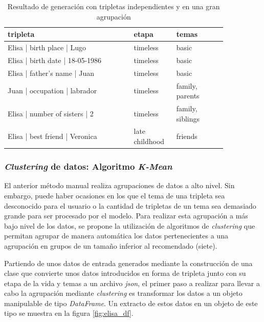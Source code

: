 \begin{table}[h!]
\begin{center}
\begin{tabular}{p{0.5\linewidth} | p{0.15\linewidth} | p{0.2\linewidth}}
\hline

\textbf{tripleta} & \textbf{etapa} & \textbf{temas}  \\ \hline
Elisa | birth place | Lugo & timeless & basic \\ \hline
Elisa | birth date | 18-05-1986 & timeless & basic \\ \hline
Elisa | father's name | Juan & timeless & basic  \\ \hline
Juan | occupation | labrador & timeless & family, parents  \\ \hline
Elisa | number of sisters | 2 & timeless & family, siblings  \\ \hline
Elisa | best friend | Veronica & late childhood & friends  \\ \hline
    
\hline
\end{tabular}
\caption{Resultado de generación con tripletas independientes y en una gran agrupación}
    \label{tab:Elisa_tags}
\end{center}
\end{table}


\subsubsection{\textit{Clustering} de datos: Algoritmo \textit{K-Mean}}

El anterior método manual realiza agrupaciones de datos a alto nivel. Sin embargo, puede haber ocasiones en los que el tema de una tripleta sea desconocido para el usuario o la cantidad de tripletas de un tema sea demasiado grande para ser procesado por el modelo. Para realizar esta agrupación a más bajo nivel de los datos, se propone la utilización de algoritmos de \textit{clustering} que permitan agrupar de manera automática los datos pertenecientes a una agrupación en grupos de un tamaño inferior al recomendado (siete).



Partiendo de unos datos de entrada generados mediante la construcción de una clase que convierte unos datos introducidos en forma de tripleta junto con su etapa de la vida y temas a un archivo \textit{json}, el primer paso a realizar para llevar a cabo la agrupación mediante \textit{clustering} es transformar los datos a un objeto manipulable de tipo \textit{DataFrame}. Un extracto de estos datos en un objeto de este tipo se muestra en la figura \ref{fig:elisa_df}.

